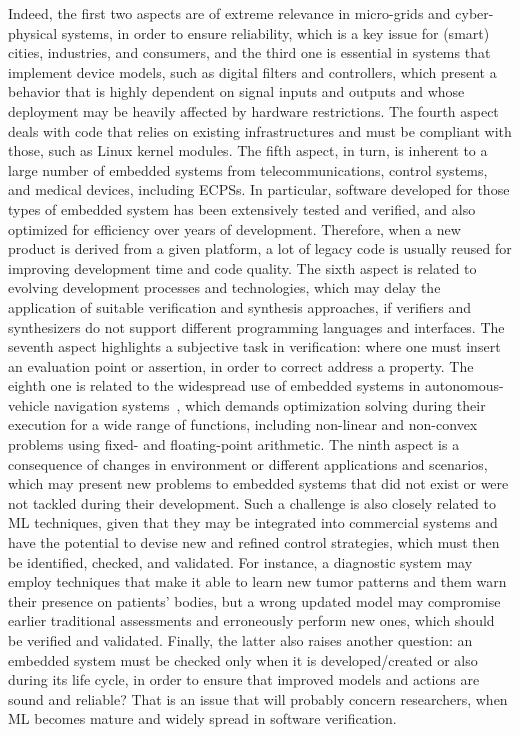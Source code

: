 \documentclass[format=acmsmall, review=false, screen=true]{acmart}
\begin{document}
Indeed, the first two aspects are of extreme relevance in micro-grids and cyber-physical systems, in order to ensure reliability, which is a key issue for (smart) cities, industries, and consumers, and the third one is essential in systems that implement device models, such as digital filters and controllers, which present a behavior that is highly dependent on signal inputs and outputs and whose deployment may be heavily affected by hardware restrictions. The fourth aspect deals with code that relies on existing infrastructures and must be compliant with those, such as Linux kernel modules. The fifth aspect, in turn, is inherent to a large number of embedded systems from  telecommunications, control systems, and medical devices, including ECPSs. In particular, software developed for those types of embedded system has been extensively tested and verified, and also optimized for efficiency over years of development. Therefore, when a new product is derived from a given platform, a lot of legacy code is usually reused for improving development time and code quality. The sixth aspect is related to evolving development processes and technologies, which may delay the application of suitable verification and synthesis approaches, if verifiers and synthesizers do not support different programming languages and interfaces. The seventh aspect highlights a subjective task in verification: where one must insert an evaluation point or assertion, in order to correct address a property. The eighth one is related to the widespread use of embedded systems in autonomous-vehicle navigation systems~\cite{Adouane16}, which demands optimization solving during their execution for a wide range of functions, including non-linear and non-convex problems using fixed- and floating-point arithmetic. The ninth aspect is a consequence of changes in environment or different applications and scenarios, which may present new problems to embedded systems that did not exist or were not tackled during their development. Such a challenge is also closely related to ML techniques, given that they may be integrated into commercial systems and have the potential to devise new and refined control strategies, which must then be identified, checked, and validated. For instance, a diagnostic system may employ techniques that make it able to learn new tumor patterns and them warn their presence on patients' bodies, but a wrong updated model may compromise earlier traditional assessments and erroneously perform new ones, which should be verified and validated. Finally, the latter also raises another question: an embedded system must be checked only when it is developed/created or also during its life cycle, in order to ensure that improved models and actions are sound and reliable? That is an issue that will probably concern researchers, when ML becomes mature and widely spread in software verification.
\end{document}
